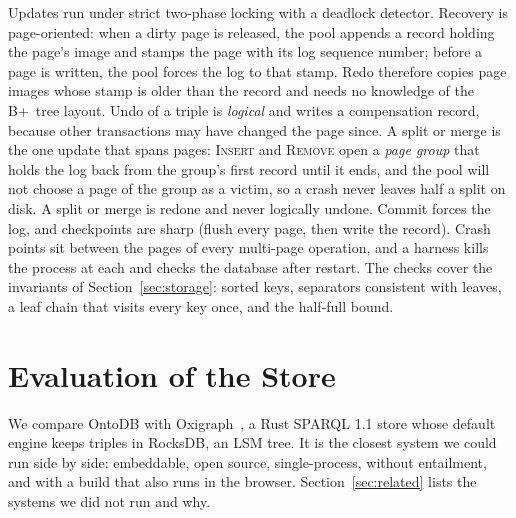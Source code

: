 \documentclass[sigconf, nonacm]{acmart}
\newcommand{\sys}{OntoDB}
\begin{document}
Updates run under strict two-phase locking with a deadlock detector. Recovery is page-oriented: when a dirty page is released, the pool appends a record holding the page's image and stamps the page with its log sequence number; before a page is written, the pool forces the log to that stamp. Redo therefore copies page images whose stamp is older than the record and needs no knowledge of the B+~tree layout. Undo of a triple is \emph{logical} and writes a compensation record, because other transactions may have changed the page since. A split or merge is the one update that spans pages: \textsc{Insert} and \textsc{Remove} open a \emph{page group} that holds the log back from the group's first record until it ends, and the pool will not choose a page of the group as a victim, so a crash never leaves half a split on disk. A split or merge is redone and never logically undone. Commit forces the log, and checkpoints are sharp (flush every page, then write the record). Crash points sit between the pages of every multi-page operation, and a harness kills the process at each and checks the database after restart. The checks cover the invariants of Section~\ref{sec:storage}: sorted keys, separators consistent with leaves, a leaf chain that visits every key once, and the half-full bound.

\section{Evaluation of the Store}
\label{sec:eval-core}

We compare \sys{} with Oxigraph~\cite{oxigraph}, a Rust SPARQL 1.1 store whose default engine keeps triples in RocksDB, an LSM tree. It is the closest system we could run side by side: embeddable, open source, single-process, without entailment, and with a build that also runs in the browser. Section~\ref{sec:related} lists the systems we did not run and why.
\end{document}
